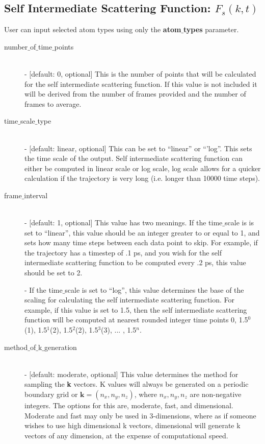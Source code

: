 \documentclass{article}
\begin{document}
\subsection{Self Intermediate Scattering Function: $F_s(k,t)$} \label{sec::Fsqt_parm}
User can input selected atom types using only the \textbf{atom$\_$types} parameter.
\begin{description}	
	\item[number$\_$of$\_$time$\_$points]\hfill \\
	- [default: 0, optional] This is the number of points that will be calculated for the self intermediate scattering function.  If this value is not included it will be derived from the number of frames provided and the number of frames to average.
	
	\item[time$\_$scale$\_$type] \hfill \\
	- [default: linear, optional] This can be set to ``linear'' or ``'log''.  This sets the time scale of the output. Self intermediate scattering function can either be computed in linear scale or log scale, log scale allows for a quicker calculation if the trajectory is very long (i.e. longer than 10000 time steps).
	
	\item[frame$\_$interval] \hfill \\
	- [default: 1, optional] This value has two meanings.  If the time$\_$scale is is set to ``linear'', this value should be an integer greater to or equal to 1, and sets how many time steps between each data point to skip.  For example, if the trajectory has a timestep of .1 ps, and you wish for the self intermediate scattering function to be computed every .2 ps, this value should be set to 2. 
	
	- If the time$\_$scale is set to ``log'', this value determines the base of the scaling for calculating the self intermediate scattering function.  For example, if this value is set to 1.5, then the self intermediate scattering function will be computed at nearest rounded integer time points 0, 1.5$^0$(1), 1.5$^1$(2), 1.5$^2$(2), 1.5$^3$(3), ... , 1.5$^{n}$.
	
	\item[method$\_$of$\_$k$\_$generation] \hfill \\
	- [default: moderate, optional] This value determines the method for sampling the \textbf{k} vectors.  K values will always be generated on a periodic boundary grid or $\mathbf{k} = (n_x,n_y,n_z)$, where $n_x, n_y, n_z$ are non-negative integers.  The options for this are, moderate, fast, and dimensional.  Moderate and fast may only be used in 3-dimensions, where as if someone wishes to use high dimensional k vectors, dimensional will generate k vectors of any dimension, at the expense of computational speed.
	

\end{description}
\end{document}
